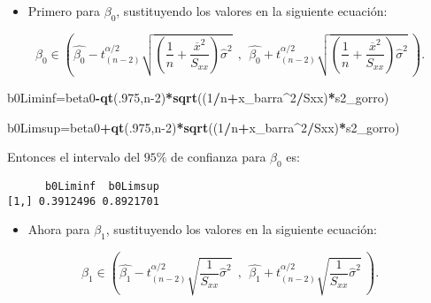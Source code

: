 \documentclass[
  a4paper,
  oneside,
  openany]{book}
\newenvironment{Shaded}{\begin{snugshade}}{\end{snugshade}}
\newcommand{\DecValTok}[1]{\textcolor[rgb]{0.00,0.00,0.81}{#1}}
\newcommand{\FunctionTok}[1]{\textcolor[rgb]{0.13,0.29,0.53}{\textbf{#1}}}
\newcommand{\NormalTok}[1]{#1}
\newcommand{\OtherTok}[1]{\textcolor[rgb]{0.56,0.35,0.01}{#1}}
\newcommand{\SpecialCharTok}[1]{\textcolor[rgb]{0.81,0.36,0.00}{\textbf{#1}}}
\providecommand{\tightlist}{%
  \setlength{\itemsep}{0pt}\setlength{\parskip}{0pt}}
\begin{document}
\begin{itemize}
\tightlist
\item
  Primero para \(\beta_{0}\), sustituyendo los valores en la siguiente ecuación:
\end{itemize}

\[\beta_{0} \in \left( \hat{\beta_{0}}-t^{\alpha/2}_{(n-2)}\sqrt{\left(\frac{1}{n}+\frac{\overline{x}^2}{S_{xx}}\right)\hat{\sigma}^2} \ \ , \ \ \hat{\beta_{0}}+t^{\alpha/2}_{(n-2)}\sqrt{\left(\frac{1}{n}+\frac{\overline{x}^2}{S_{xx}}\right)\hat{\sigma}^2} \ \right).\]

\begin{Shaded}
\begin{Highlighting}[]
\NormalTok{b0Liminf}\OtherTok{=}\NormalTok{beta0}\SpecialCharTok{{-}}\FunctionTok{qt}\NormalTok{(.}\DecValTok{975}\NormalTok{,n}\DecValTok{{-}2}\NormalTok{)}\SpecialCharTok{*}\FunctionTok{sqrt}\NormalTok{((}\DecValTok{1}\SpecialCharTok{/}\NormalTok{n}\SpecialCharTok{+}\NormalTok{x\_barra}\SpecialCharTok{\^{}}\DecValTok{2}\SpecialCharTok{/}\NormalTok{Sxx)}\SpecialCharTok{*}\NormalTok{s2\_gorro)}

\NormalTok{b0Limsup}\OtherTok{=}\NormalTok{beta0}\SpecialCharTok{+}\FunctionTok{qt}\NormalTok{(.}\DecValTok{975}\NormalTok{,n}\DecValTok{{-}2}\NormalTok{)}\SpecialCharTok{*}\FunctionTok{sqrt}\NormalTok{((}\DecValTok{1}\SpecialCharTok{/}\NormalTok{n}\SpecialCharTok{+}\NormalTok{x\_barra}\SpecialCharTok{\^{}}\DecValTok{2}\SpecialCharTok{/}\NormalTok{Sxx)}\SpecialCharTok{*}\NormalTok{s2\_gorro)}
\end{Highlighting}
\end{Shaded}

Entonces el intervalo del \(95\%\) de confianza para \(\beta_{0}\) es:

\begin{verbatim}
      b0Liminf  b0Limsup
[1,] 0.3912496 0.8921701
\end{verbatim}

\begin{itemize}
\tightlist
\item
  Ahora para \(\beta_1\), sustituyendo los valores en la siguiente ecuación:
\end{itemize}

\[\beta_{1} \in \left( \hat{\beta_{1}}-t^{\alpha/2}_{(n-2)} \sqrt{\frac{1}{S_{xx}}\hat{\sigma}^2} \ \ , \ \ \hat{\beta_{1}}+t^{\alpha/2}_{(n-2)} \sqrt{\frac{1}{S_{xx}}\hat{\sigma}^2} \ \right).\]
\end{document}
